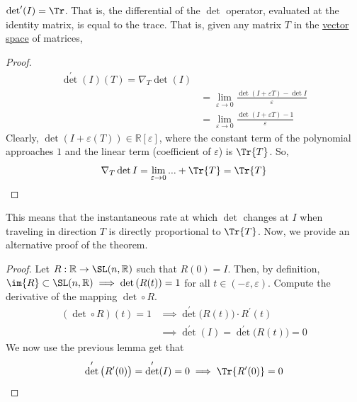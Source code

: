   \begin{lemma}
    \label{thm:differential-of-the-determinant-at-the-identity}
    $\det^\prime (I) = \Tr$. That is, the differential of the $\det$ operator, evaluated at the identity matrix, is equal to the trace. That is, given any matrix $T$ in the \hyperref[def:vector-space]{vector space} of matrices, 
  \end{lemma}
  \begin{proof}
    \begin{align*}
      \det^\prime (I) (T) = \nabla_T \det(I) \\
      & = \lim_{\varepsilon \rightarrow 0} \frac{\det{(I + \varepsilon T)} - \det{I}}{\varepsilon} \\
      & = \lim_{\varepsilon \rightarrow 0} \frac{\det{(I + \varepsilon T)} - 1}{\varepsilon}
    \end{align*}
    Clearly, $\det(I + \varepsilon(T)) \in \mathbb{R}[\varepsilon]$, where the constant term of the polynomial approaches $1$ and the linear term (coefficient of $\varepsilon$) is $\Tr{T}$. So, 
    \begin{equation}
      \nabla_T \det{I} = \lim_{\varepsilon \rightarrow 0} ... + \Tr{T} = \Tr{T}
    \end{equation}
  \end{proof}

  This means that the instantaneous rate at which $\det$ changes at $I$ when traveling in direction $T$ is directly proportional to $\Tr{T}$. Now, we provide an alternative proof of the theorem. 
  \begin{proof}
    Let $R: \mathbb{R} \rightarrow \SL(n, \mathbb{R})$ such that $R(0) = I$. Then, by definition, $\im{R} \subset \SL(n, \mathbb{R}) \implies \det{(R(t))} = 1$ for all $t \in (-\varepsilon, \varepsilon)$. Compute the derivative of the mapping $\det \circ R$. 
    \begin{align*}
        (\det \circ  R) (t) = 1 & \implies \det^\prime \big( R(t) \big) \cdot R^\prime (t) \\ 
        & \implies \det^\prime (I) = \det^\prime \big(R(t)\big) = 0 
    \end{align*}
    We now use the previous lemma get that 
    \begin{equation}
      \det^\prime \big( R^\prime(0)\big) = \det^\prime (I)=0 \implies \Tr{R^\prime(0)} = 0
    \end{equation}
  \end{proof} 

